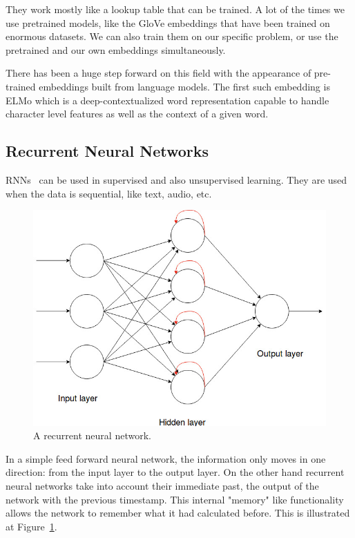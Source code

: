 They work mostly like a lookup table that can be trained. A lot of the times we use pretrained models, like the GloVe embeddings\cite{GloVe} that have been trained on enormous datasets. We can also train them on our specific problem, or use the pretrained and our own embeddings simultaneously.

There has been a huge step forward on this field with the appearance of pre-trained embeddings built from language models. The first such embedding is ELMo \cite{ELMo} which is a deep-contextualized word representation capable to handle character level features as well as the context of a given word.

\subsection{Recurrent Neural Networks}

RNNs~\cite{RNN} can be used in supervised and also unsupervised learning. They are used when the data is sequential, like text, audio, etc.

\begin{figure}[!ht]
	\centering
	\includegraphics[width=125mm, keepaspectratio]{figures/recurrent_neural_network.jpg}
	\caption{A recurrent neural network.}
	\label{fig:recurrent_net}
\end{figure}

In a simple feed forward neural network, the information only moves in one direction: from the input layer to the output layer. On the other hand recurrent neural networks take into account their immediate past, the output of the network with the previous timestamp. This internal "memory" like functionality allows the network to remember what it had calculated before. This is illustrated at Figure~\ref{fig:recurrent_net}.

